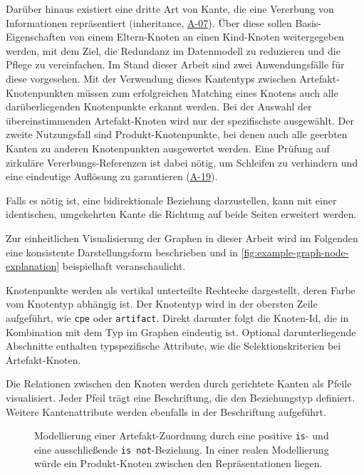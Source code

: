 Darüber hinaus existiert eine dritte Art von Kante, die eine Vererbung von Informationen repräsentiert (inheritance, \hyperref[subsec:req-selektor-inheritance]{A-07}).
Über diese sollen Basis-Eigenschaften von einem Eltern-Knoten an einen Kind-Knoten weitergegeben werden, mit dem Ziel, die Redundanz im Datenmodell zu reduzieren und die Pflege zu vereinfachen.
Im Stand dieser Arbeit sind zwei Anwendungsfälle für diese vorgesehen.
Mit der Verwendung dieses Kantentyps zwischen Artefakt-Knotenpunkten müssen zum erfolgreichen Matching eines Knotens auch alle darüberliegenden Knotenpunkte erkannt werden.
Bei der Auswahl der übereinstimmenden Artefakt-Knoten wird nur der spezifischste ausgewählt.
Der zweite Nutzungsfall sind Produkt-Knotenpunkte, bei denen auch alle geerbten Kanten zu anderen Knotenpunkten ausgewertet werden.
Eine Prüfung auf zirkuläre Vererbungs-Referenzen ist dabei nötig, um Schleifen zu verhindern und eine eindeutige Auflösung zu garantieren (\hyperref[subsec:req-graph-inner-consistency]{A-19}).

Falls es nötig ist, eine bidirektionale Beziehung darzustellen, kann mit einer identischen, umgekehrten Kante die Richtung auf beide Seiten erweitert werden.

\medskip

Zur einheitlichen Visualisierung der Graphen in dieser Arbeit wird im Folgenden eine konsistente Darstellungsform beschrieben und in \autoref{fig:example-graph-node-explanation} beispielhaft veranschaulicht.

Knotenpunkte werden als vertikal unterteilte Rechtecke dargestellt, deren Farbe vom Knotentyp abhängig ist.
Der Knotentyp wird in der obersten Zeile aufgeführt, wie \texttt{cpe} oder \texttt{artifact}.
Direkt darunter folgt die Knoten-Id, die in Kombination mit dem Typ im Graphen eindeutig ist.
Optional darunterliegende Abschnitte enthalten typspezifische Attribute, wie die Selektionskriterien bei Artefakt-Knoten.

Die Relationen zwischen den Knoten werden durch gerichtete Kanten als Pfeile visualisiert.
Jeder Pfeil trägt eine Beschriftung, die den Beziehungstyp definiert.
Weitere Kantenattribute werden ebenfalls in der Beschriftung aufgeführt.

\begin{figure}[htbp]
    \centering
    \makebox[\textwidth]{}
    \caption{Modellierung einer Artefakt-Zuordnung durch eine positive \texttt{is}- und eine ausschließende \texttt{is not}-Beziehung. In einer realen Modellierung würde ein Produkt-Knoten zwischen den Repräsentationen liegen.}
    \label{fig:example-graph-node-explanation}
\end{figure}

